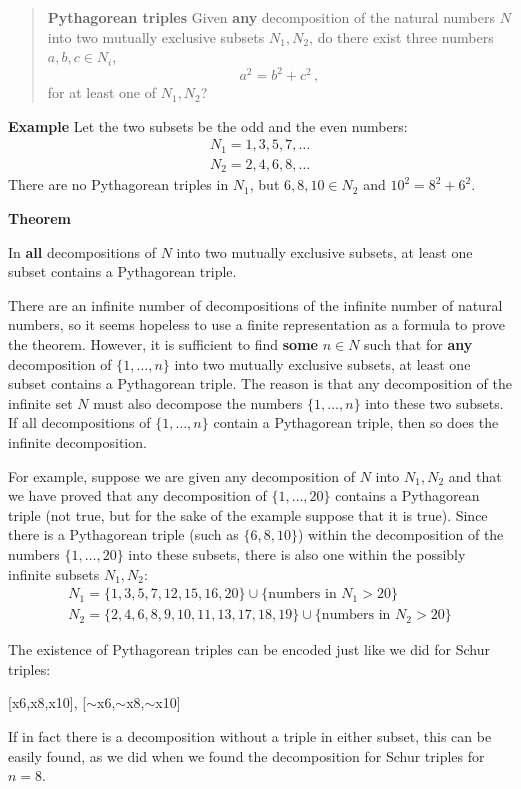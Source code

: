 \documentclass[11pt,a4paper]{article}
\begin{document}
\begin{quote}
\textbf{Pythagorean triples} Given \textbf{any} decomposition of the natural numbers $N$ into two mutually exclusive subsets $N_1,N_2$, do there exist three numbers $a,b,c\in N_i$,
\[
a^2=b^2+c^2\,,
\]
for at least one of $N_1,N_2$?
\end{quote}

\textbf{Example} Let the two subsets be the odd and the even numbers:
\begin{eqnarray*}
N_1 = 1,3,5,7,\ldots\\
N_2 = 2,4,6,8,\ldots
\end{eqnarray*}
There are no Pythagorean triples in $N_1$, but $6,8,10\in N_2$ and $10^2=8^2+6^2$.

\textbf{Theorem}

In \textbf{all} decompositions of $N$ into two mutually exclusive subsets, at least one subset contains a Pythagorean triple.

\smallskip

There are an infinite number of decompositions of the infinite number of natural numbers, so it seems hopeless to use a finite representation as a formula to prove the theorem. However, it is sufficient to find \textbf{some} $n\in N$ such that for \textbf{any} decomposition of $\{1,\ldots,n\}$ into two mutually exclusive subsets, at least one subset contains a Pythagorean triple. The reason is that any decomposition of the infinite set $N$ must also decompose the numbers $\{1,\ldots,n\}$ into these two subsets. If all decompositions of $\{1,\ldots,n\}$ contain a Pythagorean triple, then so does the infinite decomposition.

For example, suppose we are given any decomposition of $N$ into $N_1,N_2$ and that we have proved that any decomposition of $\{1,\ldots,20\}$ contains a Pythagorean triple (not true, but for the sake of the example suppose that it is true). Since there is a Pythagorean triple (such as $\{6,8,10\}$) within the decomposition of the numbers $\{1,\ldots,20\}$ into these subsets, there is also one within the possibly infinite subsets $N_1,N_2$:
\[
\begin{array}{l}
N_1 = \{1,3,5,7,12,15,16,20\} \cup \{\textrm{numbers in\ } N_1 > 20\}\\
N_2 = \{2,4,6,8,9,10,11,13,17,18,19\} \cup \{\textrm{numbers in\ } N_2 > 20\}
\end{array}
\]

The existence of Pythagorean triples can be encoded just like we did for Schur triples:
\begin{center}
\begin{ttfamily}
{[}x6,x8,x10], [$\sim$x6,$\sim$x8,$\sim$x10]
\end{ttfamily}
\end{center}
If in fact there is a decomposition without a triple in either subset, this can be easily found, as we did when we found the decomposition for Schur triples for $n=8$. 
\end{document}
